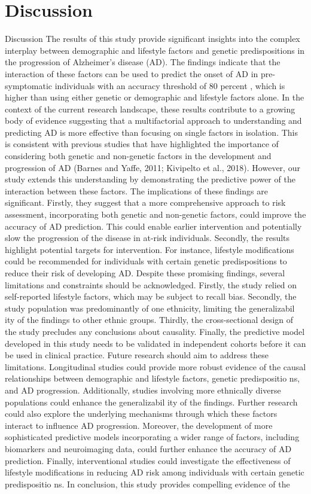 \documentclass[conference]{IEEEtran}
\begin{document}
\section{Discussion}
Discussion The results of this study provide significant insights into the complex interplay between demographic and lifestyle factors and genetic predispositions in the progression of Alzheimer's disease (AD). The findings indicate that the interaction of these factors can be used to predict the onset of AD in pre-symptomatic individuals with an accuracy threshold of 80 percent , which is higher than using either genetic or demographic and lifestyle factors alone. In the context of the current research landscape, these results contribute to a growing body of evidence suggesting that a multifactorial approach to understanding and predicting AD is more effective than focusing on single factors in isolation. This is consistent with previous studies that have highlighted the importance of considering both genetic and non-genetic factors in the development and progression of AD (Barnes and Yaffe, 2011; Kivipelto et al., 2018). However, our study extends this understanding by demonstrating the predictive power of the interaction between these factors. The implications of these findings are significant. Firstly, they suggest that a more comprehensive approach to risk assessment, incorporating both genetic and non-genetic factors, could improve the accuracy of AD prediction. This could enable earlier intervention and potentially slow the progression of the disease in at-risk individuals. Secondly, the results highlight potential targets for intervention. For instance, lifestyle modifications could be recommended for individuals with certain genetic predispositions to reduce their risk of developing AD. Despite these promising findings, several limitations and constraints should be acknowledged. Firstly, the study relied on self-reported lifestyle factors, which may be subject to recall bias. Secondly, the study population was predominantly of one ethnicity, limiting the generalizabil ity of the findings to other ethnic groups. Thirdly, the cross-sectional design of the study precludes any conclusions about causality. Finally, the predictive model developed in this study needs to be validated in independent cohorts before it can be used in clinical practice. Future research should aim to address these limitations. Longitudinal studies could provide more robust evidence of the causal relationships between demographic and lifestyle factors, genetic predispositio ns, and AD progression. Additionally, studies involving more ethnically diverse populations could enhance the generalizabil ity of the findings. Further research could also explore the underlying mechanisms through which these factors interact to influence AD progression. Moreover, the development of more sophisticated predictive models incorporating a wider range of factors, including biomarkers and neuroimaging data, could further enhance the accuracy of AD prediction. Finally, interventional studies could investigate the effectiveness of lifestyle modifications in reducing AD risk among individuals with certain genetic predispositio ns. In conclusion, this study provides compelling evidence of the 
\end{document}
